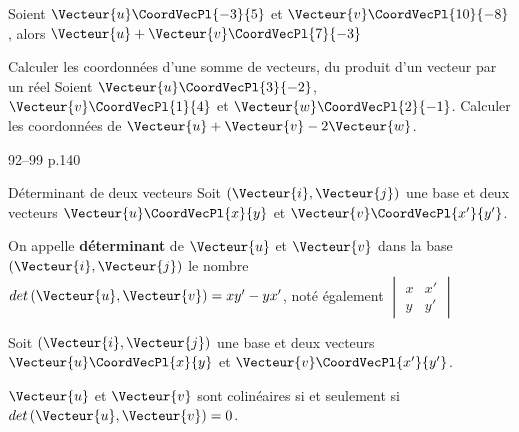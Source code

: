 \documentclass[a4paper]{article}
\begin{document}
\begin{example}{}{}
  Soient $\Vecteur{u}\CoordVecPl{-3}{5}$  et $\Vecteur{v}\CoordVecPl{10}{-8}$, alors $\Vecteur{u}+\Vecteur{v}\CoordVecPl{7}{-3}$
\end{example}


\begin{methode*}{Calculer les coordonnées d'une somme de vecteurs, du produit d'un vecteur par un réel}{}
  Soient $\Vecteur{u}\CoordVecPl{3}{-2}$, $\Vecteur{v}\CoordVecPl{1}{4}$ et $\Vecteur{w}\CoordVecPl{2}{-1}$.
  Calculer les coordonnées de $\Vecteur{u}+\Vecteur{v}-2\Vecteur{w}$.
 
   \vspace{2cm}
 
   \hfill{}
 \end{methode*}

 \begin{exercices}{}{}
  92--99 p.140
  \end{exercices}


 \pagebreak

\begin{definition}{Déterminant de deux vecteurs}{}
Soit $\left(\Vecteur{i},\Vecteur{j}\right)$ une base et deux vecteurs $\Vecteur{u}\CoordVecPl{x}{y}$ et $\Vecteur{v}\CoordVecPl{x'}{y'}$.

On appelle \textbf{déterminant} de $\Vecteur{u}$ et $\Vecteur{v}$ dans la base $\left(\Vecteur{i},\Vecteur{j}\right)$ le nombre $det\left(\Vecteur{u},\Vecteur{v}\right)=xy'-yx'$, noté également 
$\begin{vmatrix} 
  x & x' \\ 
  y & y' 
  \end{vmatrix} $
\end{definition}

\begin{propriete}{}{}
  Soit $\left(\Vecteur{i},\Vecteur{j}\right)$ une base et deux vecteurs $\Vecteur{u}\CoordVecPl{x}{y}$ et $\Vecteur{v}\CoordVecPl{x'}{y'}$.

  $\Vecteur{u}$ et $\Vecteur{v}$ sont colinéaires si et seulement si $det\left(\Vecteur{u},\Vecteur{v}\right)=0$.
\end{propriete}
\end{document}
